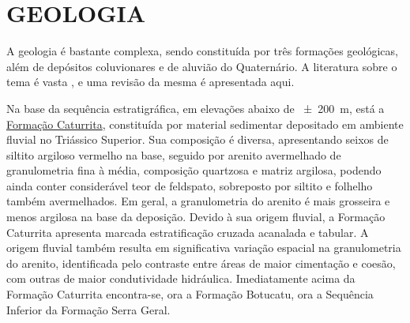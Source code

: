 \section{GEOLOGIA}
\label{sec:chap02-geologia}

A geologia é bastante complexa, sendo constituída por três formações geológicas, além de depósitos coluvionares 
e de aluvião do Quaternário. A literatura sobre o tema é vasta \cite{Bortoluzzi1974, Brasil1980, 
GasparettoEtAl1988, MacielFilho1990, Machado1998, PieriniEtAl2002, MarquesEtAl2005, Milani2005, Pinto2005, 
CPRM2007, Pedron2007, Sartori2009, NascimentoEtAl2010, WerlangEtAl2010, PedronEtAl2012}, e uma revisão da 
mesma é apresentada aqui.


\def\caturrita{\href{https://pt.wikipedia.org/wiki/Forma\%C3\%A7\%C3\%A3o_Caturrita}{Formação Caturrita}}

Na base da sequência estratigráfica, em elevações abaixo de \SI{\pm200}{\metre}, está a \caturrita{}, 
constituída por material sedimentar depositado em ambiente fluvial no Triássico Superior. Sua composição é 
diversa, apresentando seixos de siltito argiloso vermelho na base, seguido por arenito avermelhado de 
granulometria fina à média, composição quartzosa e matriz argilosa, podendo ainda conter considerável teor de 
feldspato, sobreposto por siltito e folhelho também avermelhados. Em geral, a granulometria do arenito é mais 
grosseira e menos argilosa na base da deposição. Devido à sua origem fluvial, a Formação Caturrita apresenta 
marcada estratificação cruzada acanalada e tabular. A origem fluvial também resulta em significativa variação 
espacial na granulometria do arenito, identificada pelo contraste entre áreas de maior cimentação e coesão, com 
outras de maior condutividade hidráulica. Imediatamente acima da Formação Caturrita encontra-se, ora a 
Formação Botucatu, ora a Sequência Inferior da Formação Serra Geral.


